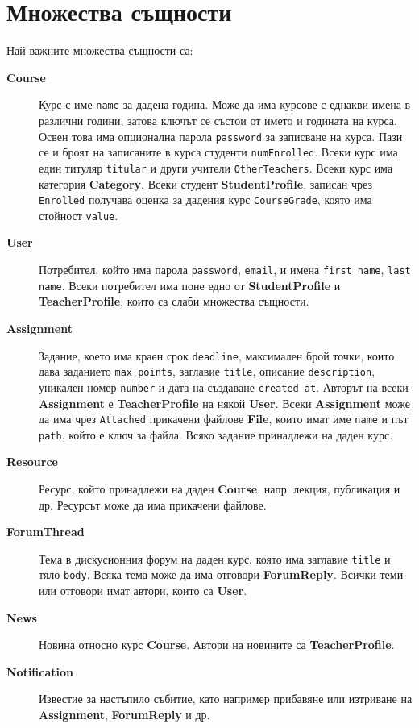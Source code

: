 \documentclass[a4paper,10pt, leqno]{article}
\newcommand{\attr}[1] {\texttt{#1}}
\newcommand{\enti}[1] {\textbf{#1}}
\newcommand{\re}[1] {\texttt{#1}}
\begin{document}
	\section{Множества същности}
	Най-важните множества същности са:
	\begin{description}
	    \item[\enti{Course}]
	      Курс с име \attr{name} за дадена година. Може да има курсове с еднакви имена в различни години, затова ключът се състои
	      от името и годината на курса. Освен това има опционална парола \attr{password} за записване на курса. Пази се и броят на записаните
	      в курса студенти \attr{numEnrolled}. Всеки курс има един титуляр \attr{titular} и други учители \re{OtherTeachers}.
	      Всеки курс има категория \enti{Category}.
	      Всеки студент \enti{StudentProfile}, записан чрез \re{Enrolled} получава оценка за дадения курс \re{CourseGrade}, която има стойност
	      \attr{value}.
	    \item[\enti{User}]
	      Потребител, който има парола \attr{password}, \attr{email}, и имена \attr{first name}, \attr{last name}.
	      Всеки потребител има поне едно от \enti{StudentProfile} и \\
	      \enti{TeacherProfile}, които са слаби множества същности.
	    \item[\enti{Assignment}]
	      Задание, което има краен срок \attr{deadline}, максимален брой точки, които дава заданието \attr{max points}, заглавие \attr{title},
	      описание \attr{description}, уникален номер \attr{number} и дата на създаване \attr{created at}. Авторът на всеки \enti{Assignment}
	      е \enti{TeacherProfile} на някой \enti{User}. Всеки \enti{Assignment} може да има чрез \re{Attached} прикачени файлове \enti{File},
	      които имат име \attr{name}
	      и път \attr{path}, който е ключ за файла. Всяко задание принадлежи на даден курс.
	    \item[\enti{Resource}]
	      Ресурс, който принадлежи на даден \enti{Course}, напр. лекция, публикация и др. 
	      Ресурсът може да има прикачени файлове.
	    \item[\enti{ForumThread}]
	      Тема в дискусионния форум на даден курс, която има заглавие \attr{title} и тяло \attr{body}. Всяка тема може да има
	      отговори \enti{ForumReply}. Всички теми или отговори имат автори, които са \enti{User}.
	    \item[\enti{News}]
	      Новина относно курс \enti{Course}. Автори на новините са \enti{TeacherProfile}.
	    \item[\enti{Notification}]
	      Известие за настъпило събитие, като например прибавяне или изтриване на \enti{Assignment}, \enti{ForumReply} и др.
	\end{description}
\end{document}
